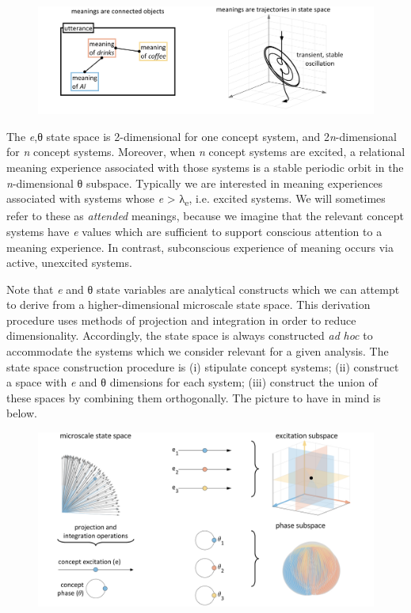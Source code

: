   
\begin{figure}
\includegraphics[width=\textwidth]{figures/Tilsen-img13.png}
\caption{\missingcaption}
\label{fig:}
\end{figure}
 

  The \textit{e},θ state space is 2-dimensional for one concept system, and 2\textit{n}{}-dimensional for \textit{n} concept systems. Moreover, when \textit{n} concept systems are excited, a relational meaning experience associated with those systems is a stable periodic orbit in the \textit{n}{}-dimensional θ subspace. Typically we are interested in meaning experiences associated with systems whose \textit{e} > λ\textsubscript{e}, i.e. excited systems. We will sometimes refer to these as \textit{attended} meanings, because we imagine that the relevant concept systems have \textit{e} values which are sufficient to support conscious attention to a meaning experience. In contrast, subconscious experience of meaning occurs via active, unexcited systems.

  Note that \textit{e} and θ state variables are analytical constructs which we can attempt to derive from a higher-dimensional microscale state space. This derivation procedure uses methods of projection and integration in order to reduce dimensionality. Accordingly, the state space is always constructed \textit{ad} \textit{hoc} to accommodate the systems which we consider relevant for a given analysis. The state space construction procedure is (i) stipulate concept systems; (ii) construct a space with \textit{e} and θ dimensions for each system; (iii) construct the union of these spaces by combining them orthogonally. The picture to have in mind is below. 

  
\begin{figure}
\includegraphics[width=\textwidth]{figures/Tilsen-img14.png}
\caption{\missingcaption}
\label{fig:}
\end{figure}
 

